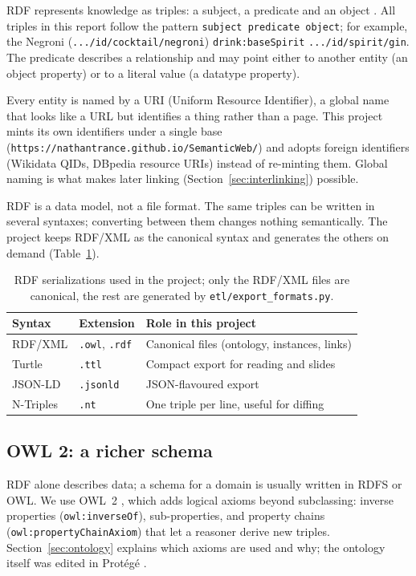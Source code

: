 RDF represents knowledge as triples: a subject, a predicate and an
object \cite{rdf11}. All triples in this report follow the pattern
\texttt{subject predicate object}; for example, the Negroni
(\texttt{.../id/cocktail/negroni}) \texttt{drink:baseSpirit}
\texttt{.../id/spirit/gin}. The predicate describes a relationship and may
point either to another entity (an object property) or to a literal value (a
datatype property).

Every entity is named by a URI (Uniform Resource Identifier),
a global name that looks like a URL but identifies a thing rather than a
page. This project mints its own identifiers under a single base
(\texttt{https://\allowbreak nathantrance.github.io/\allowbreak SemanticWeb/}) and adopts foreign
identifiers (Wikidata QIDs, DBpedia resource URIs) instead of re-minting
them. Global naming is what makes later linking (Section~\ref{sec:interlinking}) possible.

RDF is a data model, not a file format. The same triples can be written in
several syntaxes; converting between them changes nothing semantically. The
project keeps RDF/XML as the canonical syntax and generates the others on
demand (Table~\ref{tab:serializations}).

\begin{table}[h]
  \centering
  \begin{tabular}{@{}lll@{}}
    \toprule
    Syntax & Extension & Role in this project \\
    \midrule
    RDF/XML & \texttt{.owl}, \texttt{.rdf} & Canonical files (ontology, instances, links) \\
    Turtle & \texttt{.ttl} & Compact export for reading and slides \\
    JSON-LD & \texttt{.jsonld} & JSON-flavoured export \\
    N-Triples & \texttt{.nt} & One triple per line, useful for diffing \\
    \bottomrule
  \end{tabular}
  \caption{RDF serializations used in the project; only the RDF/XML files are
  canonical, the rest are generated by \texttt{etl/export\_formats.py}.}
  \label{tab:serializations}
\end{table}

\subsection{OWL 2: a richer schema}

RDF alone describes data; a schema for a domain is usually written in RDFS or
OWL. We use OWL~2 \cite{owl2}, which adds logical axioms beyond subclassing:
inverse properties (\texttt{owl:inverseOf}), sub-properties, and property
chains (\texttt{owl:propertyChainAxiom}) that let a reasoner derive new
triples. Section~\ref{sec:ontology} explains which axioms are used and why; the ontology itself
was edited in Prot\'eg\'e \cite{protege}.


